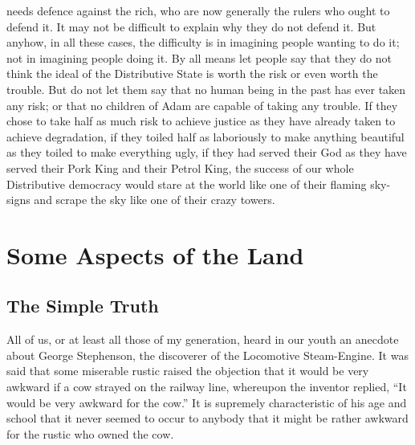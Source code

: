 \documentclass{book}
\begin{document}
needs defence against the rich, who are now generally the rulers who ought to defend it. It may not be difficult to explain why they do not defend it. But anyhow, in all these cases, the difficulty is in imagining people wanting to do it; not in imagining people doing it. By all means let people say that they do not think the ideal of the Distributive State is worth the risk or even worth the trouble. But do not let them say that no human being in the past has ever taken any risk; or that no children of Adam are capable of taking any trouble. If they chose to take half as much risk to achieve justice as they have already taken to achieve degradation, if they toiled half as laboriously to make anything beautiful as they toiled to make everything ugly, if they had served their God as they have served their Pork King and their Petrol King, the success of our whole Distributive democracy would stare at the world like one of their flaming sky-signs and scrape the sky like one of their crazy towers.

\setcounter{chapter}{0}\part{Some Aspects of the Land}
\label{chapter-10}
\chapter{The Simple Truth}
\label{chapter-11}
All of us, or at least all those of my generation, heard in our youth an anecdote about George Stephenson, the discoverer of the Locomotive Steam-Engine. It was said that some miserable rustic raised the objection that it would be very awkward if a cow strayed on the railway line, whereupon the inventor replied, “It would be very awkward for the cow.” It is supremely characteristic of his age and school that it never seemed to occur to anybody that it might be rather awkward for the rustic who owned the cow.
\end{document}
